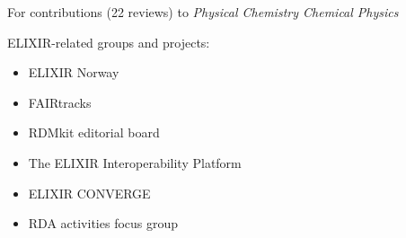 \documentclass[10pt,a4paper,ragged2e,withhyper]{altacv}
\begin{document}
\begin{paracol}{2}



\nocite{*}



\printbibliography[heading=pubtype,title={\printinfo{\faFile*[regular]}{Journal Articles (selected)}},type=article]

\divider

\printbibliography[heading=pubtype,title={\printinfo{\faCheck}{Project deliverables}},type=misc]


For contributions (22 reviews) to \textit{Physical Chemistry Chemical Physics}



\switchcolumn










ELIXIR-related groups and projects:
\begin{itemize}
\item ELIXIR Norway
\item FAIRtracks
\item RDMkit editorial board
\item The ELIXIR Interoperability Platform
\item ELIXIR CONVERGE
\item RDA activities focus group
\end{itemize}


\end{paracol}
\end{document}
